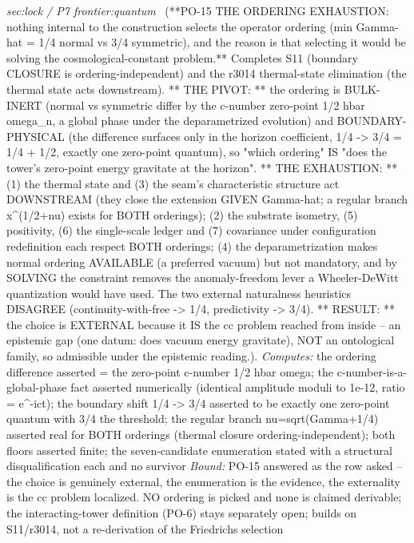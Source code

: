 \begin{description}
\textit{sec:lock / P7 frontier:quantum} \ (**PO-15 THE ORDERING EXHAUSTION: nothing internal to the construction selects the operator ordering (min Gamma-hat = 1/4 normal vs 3/4 symmetric), and the reason is that selecting it would be solving the cosmological-constant problem.** Completes S11 (boundary CLOSURE is ordering-independent) and the r3014 thermal-state elimination (the thermal state acts downstream). ** THE PIVOT: ** the ordering is BULK-INERT (normal vs symmetric differ by the c-number zero-point 1/2 hbar omega\_n, a global phase under the deparametrized evolution) and BOUNDARY-PHYSICAL (the difference surfaces only in the horizon coefficient, 1/4 -> 3/4 = 1/4 + 1/2, exactly one zero-point quantum), so "which ordering" IS "does the tower's zero-point energy gravitate at the horizon". ** THE EXHAUSTION: ** (1) the thermal state and (3) the seam's characteristic structure act DOWNSTREAM (they close the extension GIVEN Gamma-hat; a regular branch x\textasciicircum{}(1/2+nu) exists for BOTH orderings); (2) the substrate isometry, (5) positivity, (6) the single-scale ledger and (7) covariance under configuration redefinition each respect BOTH orderings; (4) the deparametrization makes normal ordering AVAILABLE (a preferred vacuum) but not mandatory, and by SOLVING the constraint removes the anomaly-freedom lever a Wheeler-DeWitt quantization would have used. The two external naturalness heuristics DISAGREE (continuity-with-free -> 1/4, predictivity -> 3/4). ** RESULT: ** the choice is EXTERNAL because it IS the cc problem reached from inside -- an epistemic gap (one datum: does vacuum energy gravitate), NOT an ontological family, so admissible under the epistemic reading.). 
\emph{Computes:} the ordering difference asserted = the zero-point c-number 1/2 hbar omega; the c-number-is-a-global-phase fact asserted numerically (identical amplitude moduli to 1e-12, ratio = e\textasciicircum{}-ict); the boundary shift 1/4 -> 3/4 asserted to be exactly one zero-point quantum with 3/4 the threshold; the regular branch nu=sqrt(Gamma+1/4) asserted real for BOTH orderings (thermal closure ordering-independent); both floors asserted finite; the seven-candidate enumeration stated with a structural disqualification each and no survivor
 \emph{Bound:} PO-15 answered as the row asked -- the choice is genuinely external, the enumeration is the evidence, the externality is the cc problem localized. NO ordering is picked and none is claimed derivable; the interacting-tower definition (PO-6) stays separately open; builds on S11/r3014, not a re-derivation of the Friedrichs selection

\end{description}
